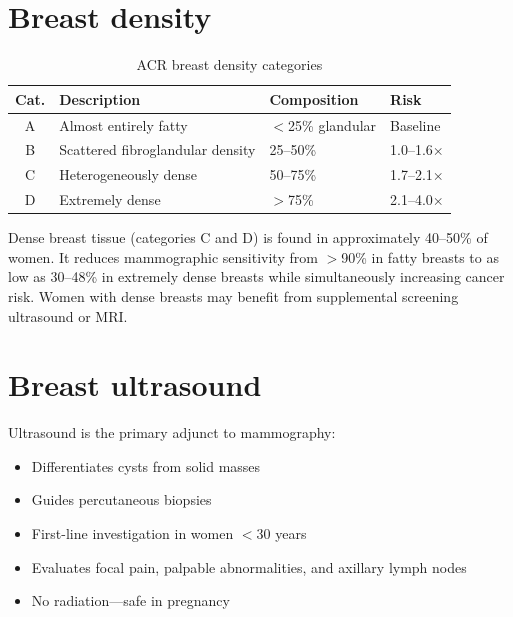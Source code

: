 \section{Breast density}

\begin{table}[h]
\centering
\caption{ACR breast density categories}
\label{tab:density}
\begin{tabular}{clll}
\hline
\textbf{Cat.} & \textbf{Description} & \textbf{Composition} & \textbf{Risk} \\
\hline
A & Almost entirely fatty & $<$25\% glandular & Baseline \\
B & Scattered fibroglandular density & 25--50\% & 1.0--1.6$\times$ \\
C & Heterogeneously dense & 50--75\% & 1.7--2.1$\times$ \\
D & Extremely dense & $>$75\% & 2.1--4.0$\times$ \\
\hline
\end{tabular}
\end{table}

\begin{pearlbox}
Dense breast tissue (categories C and D) is found in approximately 40--50\% of women. It reduces mammographic sensitivity from $>$90\% in fatty breasts to as low as 30--48\% in extremely dense breasts while simultaneously increasing cancer risk. Women with dense breasts may benefit from supplemental screening ultrasound or MRI.
\end{pearlbox}

\section{Breast ultrasound}
Ultrasound is the primary adjunct to mammography:
\begin{itemize}
    \item Differentiates cysts from solid masses
    \item Guides percutaneous biopsies
    \item First-line investigation in women $<$30 years
    \item Evaluates focal pain, palpable abnormalities, and axillary lymph nodes
    \item No radiation---safe in pregnancy
\end{itemize}

